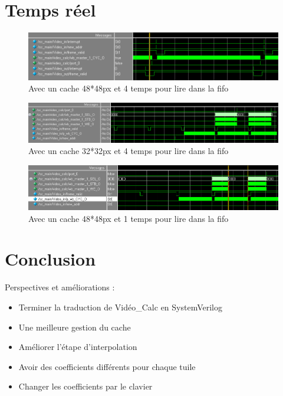 \documentclass{beamer}
\begin{document}
\section{Temps réel}
\begin{frame}
\begin{figure}[!h]
\centering
\includegraphics[scale = 0.3]{wave_r.png}
\caption{Avec un cache 48*48px et 4 temps pour lire dans la fifo}
\end{figure}
\end{frame}

\begin{frame}
\begin{figure}[!h]
\centering
\includegraphics[scale = 0.3]{wave_cache32_r.png}
\caption{Avec un cache 32*32px et 4 temps pour lire dans la fifo}
\end{figure}
\end{frame}

\begin{frame}
\begin{figure}[!h]
\centering
\includegraphics[scale = 0.3]{wave_sans_wait_r.png}
\caption{Avec un cache 48*48px et 1 temps pour lire dans la fifo}
\end{figure}
\end{frame}

\section{Conclusion}
\centering
{Perspectives et améliorations :
	\begin{itemize}
		\item Terminer la traduction de Vidéo\_Calc en SystemVerilog
		\item Une meilleure gestion du cache
		\item Améliorer l'étape d'interpolation
		\item Avoir des coefficients différents pour chaque tuile
		\item Changer les coefficients par le clavier
	\end{itemize}}
\end{document}
